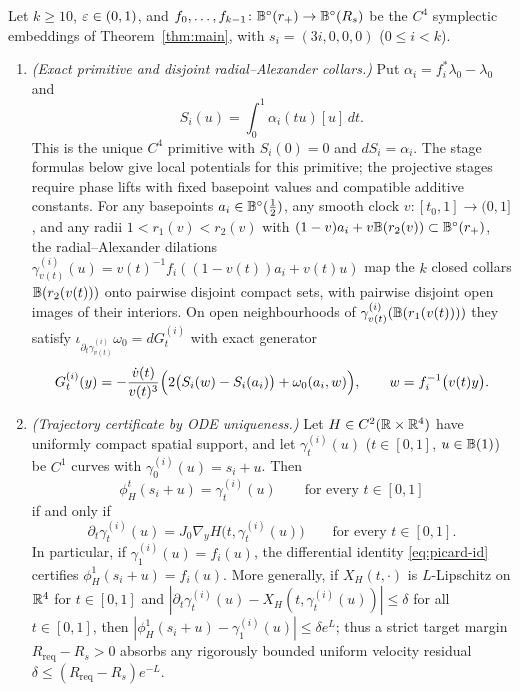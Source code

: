 \begin{proposition}\label{prop:liouville-cert}
Let $k\ge10$, $\varepsilon\in(0,1)$, and $f_0,\dots,f_{k-1}\colon\mathbb{B}^{\circ}(r_+)\to\mathbb{B}^{\circ}(R_s)$ be the $C^4$ symplectic
embeddings of Theorem~\ref{thm:main}, with $s_i=(3i,0,0,0)$ ($0\le i<k$).
\begin{enumerate}[label=(\roman*)]
\item \emph{(Exact primitive and disjoint radial--Alexander collars.)} Put $\alpha_i=f_i^*\lambda_0-\lambda_0$ and
\[
 S_i(u)=\int_0^1\alpha_i(tu)[u]\,dt.
\]
This is the unique $C^4$ primitive with $S_i(0)=0$ and $dS_i=\alpha_i$. The stage formulas below give local
potentials for this primitive; the projective stages require phase lifts with fixed basepoint values and compatible
additive constants. For any basepoints $a_i\in\mathbb{B}^{\circ}(\frac12)$, any smooth clock
$v\colon[t_0,1]\to(0,1]$, and any radii $1<r_1(v)<r_2(v)$ with $(1-v)a_i+v\mathbb{B}(r_2(v))\subset\mathbb{B}^{\circ}(r_+)$, the
radial--Alexander dilations $\gamma_{v(t)}^{(i)}(u)=v(t)^{-1}f_i((1-v(t))a_i+v(t)u)$ map the $k$ closed collars $\mathbb{B}(r_2(v(t)))$
onto pairwise disjoint compact sets, with pairwise disjoint open images of their interiors. On open neighbourhoods of
$\gamma_{v(t)}^{(i)}(\mathbb{B}(r_1(v(t))))$ they satisfy
$\iota_{\partial_t\gamma_{v(t)}^{(i)}}\omega_0=dG_t^{(i)}$ with exact generator
\[
 G_t^{(i)}(y) = -\frac{\dot v(t)}{v(t)^3}\Bigl(2\bigl(S_i(w)-S_i(a_i)\bigr)+\omega_0(a_i,w)\Bigr),\qquad
 w = f_i^{-1}\bigl(v(t)y\bigr).
\]
\item \emph{(Trajectory certificate by ODE uniqueness.)} Let $H\in C^2(\mathbb{R}\times\mathbb{R}^4)$ have uniformly compact spatial
support, and let $\gamma_t^{(i)}(u)$ ($t\in[0,1]$, $u\in\mathbb{B}(1)$) be $C^1$ curves with $\gamma_0^{(i)}(u)=s_i+u$. Then
\[
 \phi_H^t(s_i+u)=\gamma_t^{(i)}(u)\qquad\text{for every }t\in[0,1]
\]
if and only if
\begin{equation}\label{eq:picard-id}
 \partial_t\gamma_t^{(i)}(u)=J_0\nabla_yH\bigl(t,\gamma_t^{(i)}(u)\bigr)
 \qquad\text{for every }t\in[0,1].
\end{equation}
In particular, if $\gamma_1^{(i)}(u)=f_i(u)$, the differential identity \eqref{eq:picard-id} certifies
$\phi_H^1(s_i+u)=f_i(u)$. More generally, if $X_H(t,\cdot)$ is $L$-Lipschitz on $\mathbb{R}^4$ for $t\in[0,1]$ and
$|\partial_t\gamma_t^{(i)}(u)-X_H(t,\gamma_t^{(i)}(u))|\le\delta$ for all $t\in[0,1]$, then
$|\phi_H^1(s_i+u)-\gamma_1^{(i)}(u)|\le\delta e^L$; thus a strict target margin $R_{\mathrm{req}}-R_s>0$ absorbs any
rigorously bounded uniform velocity residual $\delta\le(R_{\mathrm{req}}-R_s)e^{-L}$.
\end{enumerate}
\end{proposition}

